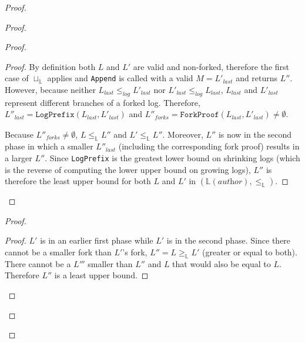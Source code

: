 \documentclass[9pt, oneside]{article}   	%
\begin{document}
\begin{proof}
\begin{proof}
\begin{proof}
			\begin{proof}
				By definition both $L$ and $L'$ are valid and non-forked, therefore the first case of $\sqcup_\mathds{L}$ applies and \texttt{Append} is called with a valid $M=L'_\textit{last}$ and returns $L''$. However, because neither $L_\textit{last} \leq_\textit{log} L'_\textit{last}$ nor $L'_\textit{last} \leq_\textit{log} L_\textit{last}$, $L_\textit{last}$ and $L'_\textit{last}$ represent different branches of a forked log. Therefore, $L''_\textit{last} = \texttt{LogPrefix}(L_\textit{last}, L'_\textit{last})$ and $L''_\textit{forks} =  \texttt{ForkProof}(L_\textit{last}, L'_\textit{last}) \neq \emptyset$. 
				
				Because $L''_\textit{forks} \neq \emptyset$, $L \leq_\mathds{L} L''$ and $L' \leq_\mathds{L} L''$. Moreover, $L''$ is now in the second phase in which a smaller $L''_\textit{last}$ (including the corresponding fork proof) results in a larger $L''$. Since \texttt{LogPrefix} is the greatest lower bound on shrinking logs (which is the reverse of computing the lower upper bound on growing logs), $L''$ is therefore the least upper bound for both $L$ and $L'$ in $(\mathds{L}(\textit{author}), \leq_\mathds{L})$. 
			\end{proof}
		
		\end{proof}

		\begin{proof}
			\begin{proof}
				 $L'$ is in an earlier first phase while $L'$ is in the second phase. Since there cannot be a smaller fork than $L'$'s fork, $L'' = L \geq_\mathds{L} L'$ (greater or equal to both). There cannot be a $L'''$ smaller than $L''$ and $L$ that would also be equal to $L$. Therefore $L''$ is a least upper bound.
			\end{proof}
			

\end{proof}
\end{proof}
\end{proof}
\end{document}
